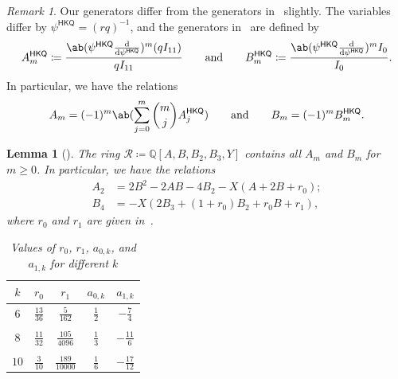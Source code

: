 \documentclass[10pt]{amsart}
\newtheorem{lem}[thm]{Lemma}
\theoremstyle{definition}
\theoremstyle{remark}
\newtheorem{rmk}[thm]{Remark}
\theoremstyle{plain}
\theoremstyle{definition}
\theoremstyle{remark}
\newcommand{\Q}{\mathbb{Q}}
\newcommand{\msc}[1]{\mathscr{#1}}
\newcommand{\ms}[1]{\mathsf{#1}}
\newcommand{\1}{\mathbf{1}}
\newcommand{\2}{\mathbf{2}}
\newcommand{\3}{\mathbf{3}}
\numberwithin{equation}{section}
\begin{document}
\begin{rmk}
    Our generators differ from the generators in~\cite{yy04,hkq} slightly. The variables differ by $\psi^{\ms{HKQ}} = (rq)^{-1}$, and the generators in~\cite{hkq} are defined by
    \[ A_m^{\ms{HKQ}} \coloneqq \frac{\ab(\psi^{\ms{HKQ}} \odv{}{\psi^{\ms{HKQ}}})^m (q I_{11})}{qI_{11}} \qquad \text{and} \qquad B_m^{\ms{HKQ}} \coloneqq \frac{\ab(\psi^{\ms{HKQ}} \odv{}{\psi^{\ms{HKQ}}})^m I_0}{I_0}. \]
    In particular, we have the relations
    \begin{align*}
        A_m = (-1)^m \ab(\sum_{j=0}^m \binom{m}{j} A_j^{\ms{HKQ}}) \qquad \text{and} \qquad
        B_m = (-1)^m B_m^{\ms{HKQ}}.
    \end{align*}
\end{rmk}

\begin{lem}[\cite{yy04}]
    The ring $\msc{R} \coloneqq \Q[A,B,B_2,B_3,Y]$ contains all $A_m$ and $B_m$ for $m \geq 0$. In particular, we have the relations
    \begin{align*}
        A_2 &= 2B^2 - 2AB - 4 B_2 - X (A + 2B + r_0); \\
        B_4 &= -X (2B_3 + (1+r_0)B_2 + r_0 B + r_1),
    \end{align*}
    where $r_0$ and $r_1$ are given in~.
    \begin{table}[htpb]
        \centering
        \caption{Values of $r_0$, $r_1$, $a_{0,k}$, and $a_{1,k}$ for different $k$}
        \label{tab:r0andr1}
    
        \begin{tabular}{ccccc}
            \toprule
            $k$ & $r_0$ & $r_1$ & $a_{0,k}$ & $a_{1,k}$ \\ 
            \midrule
            $6$ & $\frac{13}{36}$ & $\frac{5}{162}$ & $\frac{1}{2}$ & $-\frac{7}{4}$ \\
        \\[-0.8em]
            $8$ & $\frac{11}{32}$ & $\frac{105}{4096}$ & $\frac{1}{3}$ & $-\frac{11}{6}$ \\
        \\[-0.8em]
            $10$ & $\frac{3}{10}$ & $\frac{189}{10000}$ & $\frac{1}{6}$ & $-\frac{17}{12}$ \\
            \bottomrule
        \end{tabular}
    \end{table}
\end{lem}
\end{document}
